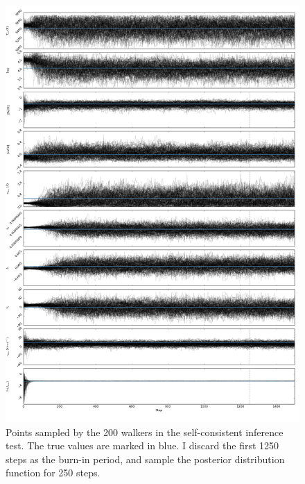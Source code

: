 \documentclass{aastex}
\begin{document}
\begin{figure}
\label{fig:chains}
\includegraphics[height=\textheight]{chains.pdf}
\caption{Points sampled by the 200 walkers in the self-consistent inference test. The true values are marked in blue. I discard the first 1250 steps as the burn-in period, and sample the posterior distribution function for 250 steps.}
\end{figure}
\end{document}
